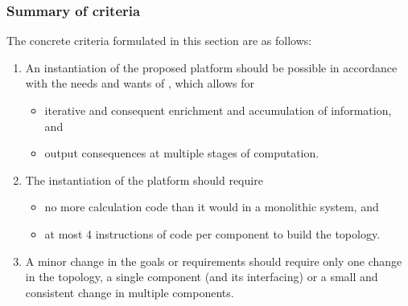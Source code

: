 \subsubsection{Summary of criteria}
The concrete criteria formulated in this section are as follows:
\begin{enumerate}
\nospace
\item An instantiation of the proposed platform should be possible in accordance with the needs and wants of \idsystems, which allows for
\begin{itemize}
\item iterative and consequent enrichment and accumulation of information, and
\item output consequences at multiple stages of computation.
\end{itemize}
\item The instantiation of the platform should require 
\begin{itemize}
\item no more calculation code than it would in a monolithic system, and
\item at most 4 instructions of code per component to build the topology.
\end{itemize}
\item A minor change in the goals or requirements should require only one change in the topology, a single component (and its interfacing) or a small and consistent change in multiple components.
\end{enumerate}


